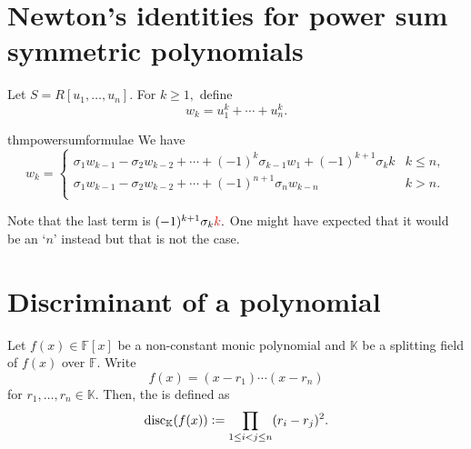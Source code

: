 \section{Newton's identities for power sum symmetric polynomials}

\begin{defn}%
    Let $S = R[u_1, \ldots, u_n].$ For $k \ge 1,$ define
    \begin{equation*} 
        w_k = u_1^k + \cdots + u_n^k.
    \end{equation*}
\end{defn}

\begin{restatable}{thm}{powersumformulae}
\label{thm:powersumformulae}
    We have
    \begin{equation} \label{eq:newident}
        w_k = \begin{cases}
            \sigma_1 w_{k - 1} - \sigma_2w_{k - 2} + \cdots + (-1)^k \sigma_{k - 1}w_1 + (-1)^{k + 1}\sigma_k k & k \le n,\\
            \sigma_1 w_{k - 1} - \sigma_2w_{k - 2} + \cdots + (-1)^{n + 1} \sigma_{n}w_{k - n} & k > n.\\
                
        \end{cases}
    \end{equation} 
    \hfill\hyperref[thm:powersumformulae2]{\downsym}
\end{restatable}

Note that the last term is $(-1)^{k + 1} \sigma_k {\color{red}k}.$ One might have expected that it would be an `$n$' instead but that is not the case.

\section{Discriminant of a polynomial}

\begin{defn}%
    Let $f(x) \in \mathbb{F}[x]$ be a non-constant monic polynomial and $\mathbb{K}$ be a splitting field of $f(x)$ over $\mathbb{F}.$ Write
    \begin{equation*} 
        f(x) = (x - r_1) \cdots (x - r_n)
    \end{equation*}
    for $r_1, \ldots, r_n \in \mathbb{K}.$ Then, the  is defined as
    \begin{equation*} 
        \operatorname{disc}_{\mathbb{K}}(f(x)) \vcentcolon= \prod_{1 \le i < j \le n} (r_i - r_j)^2.
    \end{equation*}
\end{defn}

